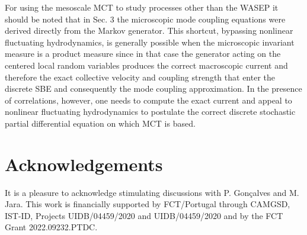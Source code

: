 \documentclass[12pt]{article}
\begin{document}
For using the mesoscale MCT to study processes other than the WASEP
it should be noted that
in Sec. 3 the microscopic mode coupling equations were derived 
directly from the Markov generator. This shortcut, bypassing nonlinear 
fluctuating hydrodynamics, is generally possible when the microscopic 
invariant measure is a product measure since in that case the
generator acting on the centered local random variables
produces the correct macroscopic current and therefore
the exact collective velocity and coupling strength that enter
the discrete SBE and consequently the mode coupling approximation. In the presence of correlations, however, one needs to
compute the exact current and appeal to nonlinear fluctuating 
hydrodynamics \cite{Spoh14} to postulate the correct
discrete stochastic partial differential equation on which MCT
is based.


\section*{Acknowledgements}
It is a pleasure to acknowledge stimulating discussions with
P. Gon\c{c}alves and M. Jara. This work is financially 
supported by FCT/Portugal through CAMGSD, IST-ID, Projects  UIDB/04459/2020 and UIDB/04459/2020 and by the FCT Grant  2022.09232.PTDC.
\end{document}
